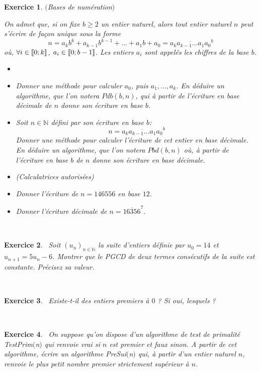 \documentclass[11pt,a4paper]{article}
\newtheorem{ex}{Exercice}
\begin{document}
\begin{ex}$($Bases de numération$)$

On admet que, si on fixe $b\geqslant 2$ un entier naturel, alors tout entier naturel $n$ peut s'écrire de façon unique sous la forme
$$ n=a_k b^k +a_{k-1}b^{k-1}+ \ldots + a_1 b +a_0= \overline{a_k a_{k-1}\ldots a_1 a_0}^b  $$
où, $ \forall i \in \llbracket 0; k \rrbracket $, $a_i \in \llbracket 0; b-1 \rrbracket$. Les entiers $a_i$ sont appelés les chiffres de la base $b$.
\begin{itemize}
\item[\textbf{Algorithmes}] 
\item[$1.$] Donner une méthode pour calculer $a_0$, puis $a_1, \ldots, a_k$.  En déduire un algorithme, que l'on notera $Pdb(b,n)$, qui à partir de l'écriture en base décimale de $n$ donne son écriture en base $b$. 
\item[$2.$] Soit $n \in \mathbb{N}$ défini par son écriture en base $b$:
$$ n=\overline{a_k a_{k-1}\ldots a_1 a_0}^b  $$
Donner une méthode pour calculer l'écriture de cet entier en base décimale. En déduire un algorithme, que l'on notera $Pbd(b,n)$ où, à partir de l'écriture en base $b$ de $n$ donne son écriture en base décimale.
\item[\textbf{Applications}](Calculatrices autorisées)
\item[$3.$] Donner l'écriture de $n=146556$ en base $12$.
\item[$4.$] Donner l'écriture décimale de $n=\overline{16356}^7$.
\end{itemize}

\end{ex}

\


\begin{ex}\
Soit $(u_n)_{n \in \mathbb{N}}$ la suite d'entiers définie par $u_0=14$ et $u_{n+1}=5 u_n -6$. Montrer que le PGCD de deux termes consécutifs de la suite est constante. Précisez sa valeur.
\end{ex}


\
\begin{ex}\
Existe-t-il des entiers premiers à $0$ ? Si oui, lesquels ?
\end{ex}


\



\begin{ex}\
On suppose qu'on dispose d'un algorithme de test de primalité TestPrim$($n$)$ qui renvoie vrai si $n$ est premier et faux sinon. A partir de cet algorithme, écrire un algorithme PreSui$($n$)$ qui, à partir d'un entier naturel $n$, renvoie le plus petit nombre premier strictement supérieur à $n$.
\end{ex}
\end{document}
